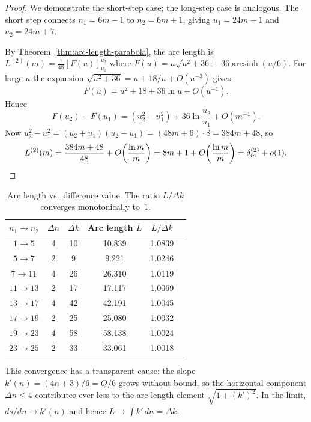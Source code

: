 \begin{proof}
We demonstrate the short-step case; the long-step case is analogous.
The short step connects $n_1 = 6m-1$ to $n_2 = 6m+1$, giving
$u_1 = 24m-1$ and $u_2 = 24m+7$.

By Theorem~\ref{thm:arc-length-parabola}, the arc length is
$L^{(2)}(m) = \frac{1}{48}[F(u)]_{u_1}^{u_2}$ where
$F(u) = u\sqrt{u^2+36} + 36\operatorname{arcsinh}(u/6)$.
For large $u$ the expansion
$\sqrt{u^2+36} = u + 18/u + O(u^{-3})$ gives:
\[
  F(u) = u^2 + 18 + 36\ln u + O(u^{-1}).
\]
Hence
\[
  F(u_2) - F(u_1)
  = (u_2^2 - u_1^2) + 36\ln\frac{u_2}{u_1} + O(m^{-1}).
\]
Now $u_2^2 - u_1^2 = (u_2+u_1)(u_2-u_1) = (48m+6)\cdot 8 = 384m + 48$,
so
\[
  L^{(2)}(m) = \frac{384m+48}{48} + O\!\left(\frac{\ln m}{m}\right)
             = 8m + 1 + O\!\left(\frac{\ln m}{m}\right)
             = \delta^{(2)}_m + o(1).
             \qedhere
\]
\end{proof}

\begin{table}[H]
\centering
\caption{Arc length vs.\ difference value. The ratio $L/\Delta k$
  converges monotonically to~$1$.}
\renewcommand{\arraystretch}{1.15}
\begin{tabular}{cccccc}
\toprule
$n_1 \to n_2$ & $\Delta n$ & $\Delta k$ & Arc length $L$ & $L / \Delta k$ \\
\midrule
 $1 \to  5$ & 4 & 10 & 10.839 & 1.0839 \\
 $5 \to  7$ & 2 &  9 &  9.221 & 1.0246 \\
 $7 \to 11$ & 4 & 26 & 26.310 & 1.0119 \\
$11 \to 13$ & 2 & 17 & 17.117 & 1.0069 \\
$13 \to 17$ & 4 & 42 & 42.191 & 1.0045 \\
$17 \to 19$ & 2 & 25 & 25.080 & 1.0032 \\
$19 \to 23$ & 4 & 58 & 58.138 & 1.0024 \\
$23 \to 25$ & 2 & 33 & 33.061 & 1.0018 \\
\bottomrule
\end{tabular}
\end{table}

\begin{remark}
This convergence has a transparent cause: the slope
$k'(n) = (4n+3)/6 = Q/6$ grows without bound, so the horizontal
component $\Delta n \leq 4$ contributes ever less to the arc-length
element $\sqrt{1 + (k')^2}$. In the limit, $ds/dn \to k'(n)$ and
hence $L \to \int k'\,dn = \Delta k$.
\end{remark}

